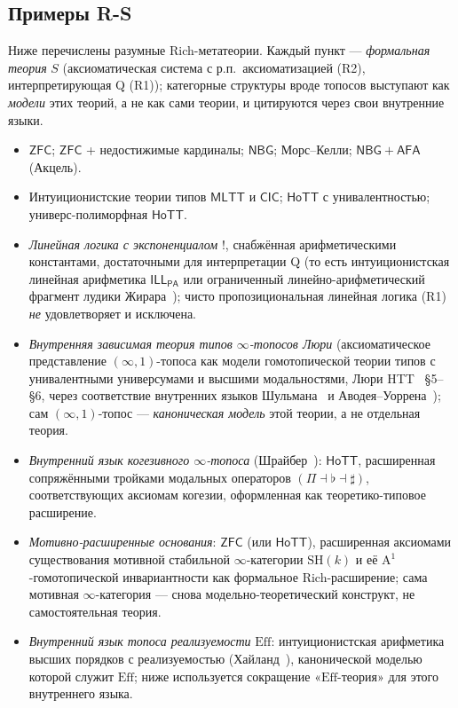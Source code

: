 \documentclass[11pt]{article}
\theoremstyle{plain}
\theoremstyle{definition}
\newcommand{\ZFC}{\mathsf{ZFC}}
\newcommand{\MLTT}{\mathsf{MLTT}}
\newcommand{\HoTT}{\mathsf{HoTT}}
\newcommand{\CIC}{\mathsf{CIC}}
\newcommand{\NBG}{\mathsf{NBG}}
\newcommand{\AFA}{\mathsf{AFA}}
\begin{document}
\subsection{Примеры R-S}

Ниже перечислены разумные Rich-метатеории. Каждый пункт — \emph{формальная теория} $S$ (аксиоматическая система с р.п.\ аксиоматизацией (R2), интерпретирующая Q (R1)); категорные структуры вроде топосов выступают как \emph{модели} этих теорий, а не как сами теории, и цитируются через свои внутренние языки.
\begin{itemize}
\item $\ZFC$; $\ZFC$ + недостижимые кардиналы; $\NBG$; Морс--Келли; $\NBG + \AFA$ (Акцель).
\item Интуиционистские теории типов $\MLTT$ и $\CIC$; $\HoTT$ с унивалентностью; универс-полиморфная $\HoTT$.
\item \emph{Линейная логика с экспоненциалом} $!$, снабжённая арифметическими константами, достаточными для интерпретации Q (то есть интуиционистская линейная арифметика $\mathsf{ILL}_{\mathsf{PA}}$ или ограниченный линейно-арифметический фрагмент лудики Жирара~\cite{Girard2001}); чисто пропозициональная линейная логика (R1) \emph{не} удовлетворяет и исключена.
\item \emph{Внутренняя зависимая теория типов $\infty$-топосов Люри} (аксиоматическое представление $(\infty, 1)$-топоса как модели гомотопической теории типов с унивалентными универсумами и высшими модальностями, Люри HTT~\cite{LurieHTT} \S 5--\S 6, через соответствие внутренних языков Шульмана~\cite{Shulman2019} и Аводея--Уоррена~\cite{AwodeyWarren2009}); сам $(\infty, 1)$-топос — \emph{каноническая модель} этой теории, а не отдельная теория.
\item \emph{Внутренний язык когезивного $\infty$-топоса} (Шрайбер~\cite{Schreiber2013}): $\HoTT$, расширенная сопряжёнными тройками модальных операторов $(\Pi \dashv \flat \dashv \sharp)$, соответствующих аксиомам когезии, оформленная как теоретико-типовое расширение.
\item \emph{Мотивно-расширенные основания}: $\ZFC$ (или $\HoTT$), расширенная аксиомами существования мотивной стабильной $\infty$-категории $\mathrm{SH}(k)$ и её $\mathrm{A}^1$-гомотопической инвариантности как формальное Rich-расширение; сама мотивная $\infty$-категория — снова модельно-теоретический конструкт, не самостоятельная теория.
\item \emph{Внутренний язык топоса реализуемости} $\mathrm{Eff}$: интуиционистская арифметика высших порядков с реализуемостью (Хайланд~\cite{Hyland1982}), канонической моделью которой служит $\mathrm{Eff}$; ниже используется сокращение «$\mathrm{Eff}$-теория» для этого внутреннего языка.

\end{itemize}
\end{document}
